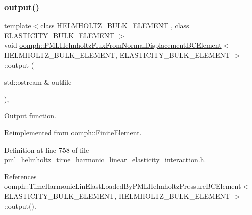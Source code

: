 \subsubsection{\texorpdfstring{output()}{output()}\hspace{0.1cm}{\footnotesize\ttfamily [1/4]}}
{\footnotesize\ttfamily template$<$class H\+E\+L\+M\+H\+O\+L\+T\+Z\+\_\+\+B\+U\+L\+K\+\_\+\+E\+L\+E\+M\+E\+NT , class E\+L\+A\+S\+T\+I\+C\+I\+T\+Y\+\_\+\+B\+U\+L\+K\+\_\+\+E\+L\+E\+M\+E\+NT $>$ \\
void \hyperlink{classoomph_1_1PMLHelmholtzFluxFromNormalDisplacementBCElement}{oomph\+::\+P\+M\+L\+Helmholtz\+Flux\+From\+Normal\+Displacement\+B\+C\+Element}$<$ H\+E\+L\+M\+H\+O\+L\+T\+Z\+\_\+\+B\+U\+L\+K\+\_\+\+E\+L\+E\+M\+E\+NT, E\+L\+A\+S\+T\+I\+C\+I\+T\+Y\+\_\+\+B\+U\+L\+K\+\_\+\+E\+L\+E\+M\+E\+NT $>$\+::output (\begin{DoxyParamCaption}\item[{std\+::ostream \&}]{outfile }\end{DoxyParamCaption})\hspace{0.3cm}{\ttfamily [inline]}, {\ttfamily [virtual]}}



Output function. 



Reimplemented from \hyperlink{classoomph_1_1FiniteElement_a2ad98a3d2ef4999f1bef62c0ff13f2a7}{oomph\+::\+Finite\+Element}.



Definition at line 758 of file pml\+\_\+helmholtz\+\_\+time\+\_\+harmonic\+\_\+linear\+\_\+elasticity\+\_\+interaction.\+h.



References oomph\+::\+Time\+Harmonic\+Lin\+Elast\+Loaded\+By\+P\+M\+L\+Helmholtz\+Pressure\+B\+C\+Element$<$ E\+L\+A\+S\+T\+I\+C\+I\+T\+Y\+\_\+\+B\+U\+L\+K\+\_\+\+E\+L\+E\+M\+E\+N\+T, H\+E\+L\+M\+H\+O\+L\+T\+Z\+\_\+\+B\+U\+L\+K\+\_\+\+E\+L\+E\+M\+E\+N\+T $>$\+::output().

\mbox{\label{classoomph_1_1PMLHelmholtzFluxFromNormalDisplacementBCElement_af0317c3b22f661138ddc31968c67eed8}} 
